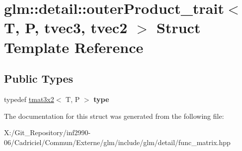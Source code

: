 \hypertarget{structglm_1_1detail_1_1outer_product__trait_3_01_t_00_01_p_00_01tvec3_00_01tvec2_01_4}{\section{glm\-:\-:detail\-:\-:outer\-Product\-\_\-trait$<$ T, P, tvec3, tvec2 $>$ Struct Template Reference}
\label{structglm_1_1detail_1_1outer_product__trait_3_01_t_00_01_p_00_01tvec3_00_01tvec2_01_4}
}
\subsection*{Public Types}
\begin{DoxyCompactItemize}
\item 
\hypertarget{structglm_1_1detail_1_1outer_product__trait_3_01_t_00_01_p_00_01tvec3_00_01tvec2_01_4_a241608939fa083f2ddb7c701be75a732}{typedef \hyperlink{structglm_1_1detail_1_1tmat3x2}{tmat3x2}$<$ T, P $>$ {\bfseries type}}\label{structglm_1_1detail_1_1outer_product__trait_3_01_t_00_01_p_00_01tvec3_00_01tvec2_01_4_a241608939fa083f2ddb7c701be75a732}

\end{DoxyCompactItemize}


The documentation for this struct was generated from the following file\-:\begin{DoxyCompactItemize}
\item 
X\-:/\-Git\-\_\-\-Repository/inf2990-\/06/\-Cadriciel/\-Commun/\-Externe/glm/include/glm/detail/func\-\_\-matrix.\-hpp\end{DoxyCompactItemize}

